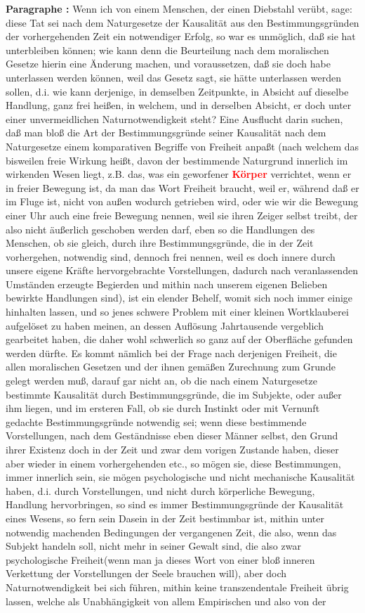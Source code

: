 \documentclass[a4paper,12pt,twoside]{book}
\newcommand{\match}[1]{\textcolor{red}{\textbf{#1}}}
\begin{document}
	\textbf{Paragraphe : }Wenn ich von einem Menschen, der einen Diebstahl verübt, sage: diese Tat sei nach dem Naturgesetze der Kausalität aus den Bestimmungsgründen der vorhergehenden Zeit ein notwendiger Erfolg, so war es unmöglich, daß sie hat unterbleiben können; wie kann denn die Beurteilung nach dem moralischen Gesetze hierin eine Änderung machen, und voraussetzen, daß sie doch habe unterlassen werden können, weil das Gesetz sagt, sie hätte unterlassen werden sollen, d.i. wie kann derjenige, in demselben Zeitpunkte, in Absicht auf dieselbe Handlung, ganz frei heißen, in welchem, und in  derselben Absicht, er doch unter einer unvermeidlichen Naturnotwendigkeit steht? Eine Ausflucht darin suchen, daß man bloß die Art der Bestimmungsgründe seiner Kausalität nach dem Naturgesetze einem komparativen Begriffe von Freiheit anpaßt (nach welchem das bisweilen freie Wirkung heißt, davon der bestimmende Naturgrund innerlich im wirkenden Wesen liegt, z.B. das, was ein geworfener \match{Körper} verrichtet, wenn er in freier Bewegung ist, da man das Wort Freiheit braucht, weil er, während daß er im Fluge ist, nicht von außen wodurch getrieben wird, oder wie wir die Bewegung einer Uhr auch eine freie Bewegung nennen, weil sie ihren Zeiger selbst treibt, der also nicht äußerlich geschoben werden darf, eben so die Handlungen des Menschen, ob sie gleich, durch ihre Bestimmungsgründe, die in der Zeit vorhergehen, notwendig sind, dennoch frei nennen, weil es doch innere durch unsere eigene Kräfte hervorgebrachte Vorstellungen, dadurch nach veranlassenden Umständen erzeugte Begierden und mithin nach unserem eigenen Belieben bewirkte Handlungen sind), ist ein elender Behelf, womit sich noch immer einige hinhalten lassen, und so jenes schwere Problem mit einer kleinen Wortklauberei aufgelöset zu haben meinen, an dessen Auflösung Jahrtausende vergeblich gearbeitet haben, die daher wohl schwerlich so ganz auf der Oberfläche gefunden werden dürfte. Es kommt nämlich bei der Frage nach derjenigen Freiheit, die allen moralischen Gesetzen und der ihnen gemäßen Zurechnung zum Grunde gelegt werden muß, darauf gar nicht an, ob die nach einem Naturgesetze bestimmte Kausalität durch Bestimmungsgründe, die im Subjekte, oder außer ihm liegen, und im ersteren Fall, ob sie durch Instinkt oder mit Vernunft gedachte Bestimmungsgründe notwendig sei; wenn diese bestimmende Vorstellungen, nach dem Geständnisse eben dieser Männer selbst, den Grund ihrer Existenz doch in der Zeit und zwar dem vorigen Zustande haben, dieser aber wieder in einem vorhergehenden etc., so mögen sie, diese Bestimmungen, immer innerlich sein, sie mögen psychologische und nicht mechanische Kausalität haben, d.i. durch Vorstellungen, und nicht durch körperliche Bewegung,  Handlung hervorbringen, so sind es immer Bestimmungsgründe der Kausalität eines Wesens, so fern sein Dasein in der Zeit bestimmbar ist, mithin unter notwendig machenden Bedingungen der vergangenen Zeit, die also, wenn das Subjekt handeln soll, nicht mehr in seiner Gewalt sind, die also zwar psychologische Freiheit(wenn man ja dieses Wort von einer bloß inneren Verkettung der Vorstellungen der Seele brauchen will), aber doch Naturnotwendigkeit bei sich führen, mithin keine transzendentale Freiheit übrig lassen, welche als Unabhängigkeit von allem Empirischen und also von der 
\end{document}
